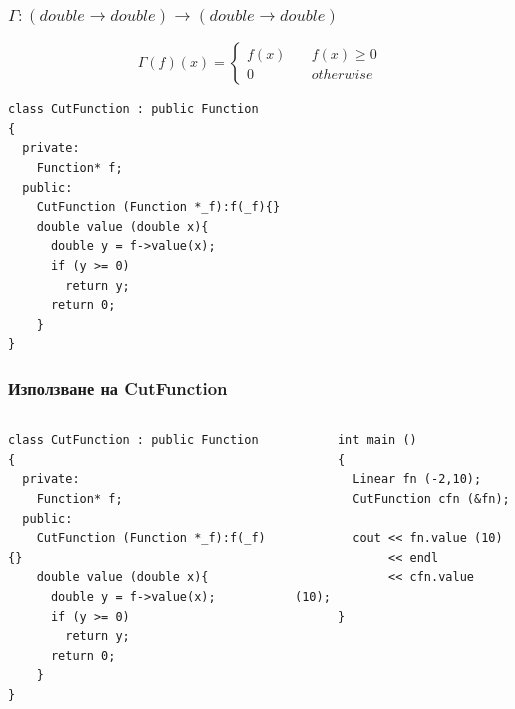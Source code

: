 \documentclass{beamer}
\begin{document}
\begin{frame}[fragile]
\frametitle{$\Gamma:(double \rightarrow double)\rightarrow(double \rightarrow double)$}

\begin{center}
$$
\Gamma(f)(x) = \left\{
        \begin{array}{ll}
            f(x) & \quad f(x) \geq 0 \\
            0 & \quad otherwise
        \end{array}
    \right.
$$

\begin{lstlisting}
class CutFunction : public Function
{
  private:
    Function* f;
  public:
    CutFunction (Function *_f):f(_f){}
    double value (double x){
      double y = f->value(x);
      if (y >= 0)
        return y;
      return 0;
    }
}
\end{lstlisting}

\end{center}


\end{frame}


\begin{frame}[fragile]
\frametitle{Използване на CutFunction}


\begin{columns}[t]
  \begin{column}{0.50\textwidth}


      \begin{flushleft}
\begin{lstlisting}
class CutFunction : public Function
{
  private:
    Function* f;
  public:
    CutFunction (Function *_f):f(_f){}
    double value (double x){
      double y = f->value(x);
      if (y >= 0)
        return y;
      return 0;
    }
}
\end{lstlisting}

      \end{flushleft}

  \end{column}
  \begin{column}{0.5\textwidth}
      \begin{flushleft}

      \begin{lstlisting}
      int main ()
      {
        Linear fn (-2,10);
        CutFunction cfn (&fn);

        cout << fn.value (10)
             << endl
             << cfn.value (10);
      }
      \end{lstlisting}

      \end{flushleft}

  \end{column}
\end{columns}



\end{frame}
\end{document}
